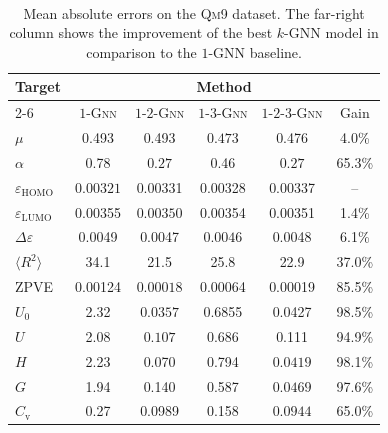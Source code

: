 \documentclass[letterpaper]{article}
\theoremstyle{definition}
\begin{document}
\begin{table}[t]\
	\caption{%
		Mean absolute errors on the \textsc{Qm9} dataset. The far-right column shows the improvement of the best $k$-GNN model in comparison to the $1$-GNN baseline.
	}%
	\label{fig:qm9_results}
	\renewcommand{\arraystretch}{1.0}
	\centering
	\begin{tabular}{lccccc}
		\toprule
		\multirow{3}{*}{\vspace*{8pt}\textbf{Target}} & \multicolumn{5}{c}{\textbf{Method}} \\
		\cmidrule{2-6}
		&   \textsc{$1$-Gnn}   & \!\textsc{$1$-$2$-Gnn} & \textsc{$1$-$3$-Gnn} & \textsc{$1$-$2$-$3$-Gnn}\! & Gain   \\
		\midrule
		$\mu$                                      & 0.493              & 0.493                  & $\mathbf{0.473}$     & 0.476                      & 4.0\%  \\
		$\alpha$                                                   & 0.78               & $\mathbf{0.27}$        & 0.46                 & $\mathbf{0.27}$            & 65.3\% \\
		$\varepsilon_{\text{HOMO}}$            & $\mathbf{0.00321}$ & 0.00331                & 0.00328              & 0.00337                    & --     \\
		$\varepsilon_{\text{LUMO}}$                  & 0.00355            & $\mathbf{0.00350}$     & 0.00354              & 0.00351                    & 1.4\%  \\
		$\Delta\varepsilon$                           & 0.0049             & 0.0047                 & $\mathbf{0.0046}$    & 0.0048                     & 6.1\%  \\
		$\langle R^2 \rangle$                       & 34.1               & 21.5                   & 25.8                 & 22.9                       & 37.0\% \\
		\textsc{ZPVE}                      & 0.00124            & $\mathbf{0.00018}$     & 0.00064              & 0.00019                    & 85.5\% \\
		$U_0$                                         & 2.32               & $\mathbf{0.0357}$      & 0.6855               & 0.0427                     & 98.5\% \\
		$U$                                                 & 2.08               & $\mathbf{0.107}$       & 0.686                & 0.111                      & 94.9\% \\
		$H$                                                      & 2.23               & 0.070                  & 0.794                & $\mathbf{0.0419}$          & 98.1\% \\
		$G$                                              & 1.94               & 0.140                  & 0.587                & $\mathbf{0.0469}$          & 97.6\% \\
		$C_{\text{v}}$                                & 0.27               & 0.0989                 & 0.158                & $\mathbf{0.0944}$          & 65.0\% \\
		\bottomrule
	\end{tabular}
\end{table}
\end{document}
